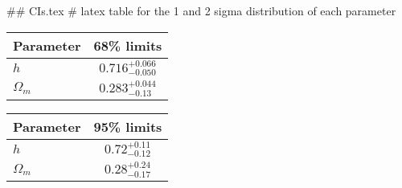 ## CIs.tex
# latex table for the 1 and 2 sigma distribution of each parameter

\begin{tabular} { l  c}
 Parameter &  68\% limits\\
\hline
{\boldmath$h              $} & $0.716^{+0.066}_{-0.050}   $\\
{\boldmath$\Omega_m       $} & $0.283^{+0.044}_{-0.13}    $\\
\hline
\end{tabular}

\begin{tabular} { l  c}
 Parameter &  95\% limits\\
\hline
{\boldmath$h              $} & $0.72^{+0.11}_{-0.12}      $\\
{\boldmath$\Omega_m       $} & $0.28^{+0.24}_{-0.17}      $\\
\hline
\end{tabular}
